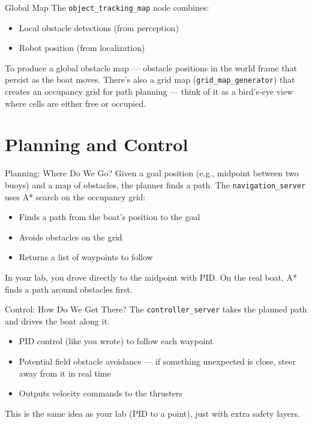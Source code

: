 \documentclass[aspectratio=169]{beamer}
\begin{document}
\begin{frame}{Global Map}
    The \texttt{object\_tracking\_map} node combines:
    \begin{itemize}
        \item Local obstacle detections (from perception)
        \item Robot position (from localization)
    \end{itemize}
    \vfill
    To produce a global obstacle map --- obstacle positions in the world frame that persist as the boat moves.
    \vfill
    There's also a grid map (\texttt{grid\_map\_generator}) that creates an occupancy grid for path planning --- think of it as a bird's-eye view where cells are either free or occupied.
\end{frame}

\section{Planning and Control}

\begin{frame}{Planning: Where Do We Go?}
    Given a goal position (e.g., midpoint between two buoys) and a map of obstacles, the planner finds a path.
    \vfill
    The \texttt{navigation\_server} uses A* search on the occupancy grid:
    \begin{itemize}
        \item Finds a path from the boat's position to the goal
        \item Avoids obstacles on the grid
        \item Returns a list of waypoints to follow
    \end{itemize}
    \vfill
    In your lab, you drove directly to the midpoint with PID. On the real boat, A* finds a path around obstacles first.
\end{frame}

\begin{frame}{Control: How Do We Get There?}
    The \texttt{controller\_server} takes the planned path and drives the boat along it.
    \vfill
    \begin{itemize}
        \item PID control (like you wrote) to follow each waypoint
        \item Potential field obstacle avoidance --- if something unexpected is close, steer away from it in real time
        \item Outputs velocity commands to the thrusters
    \end{itemize}
    \vfill
    This is the same idea as your lab (PID to a point), just with extra safety layers.
\end{frame}
\end{document}
